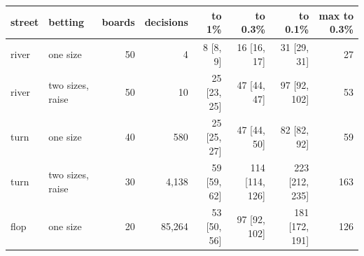 \begin{tabular}{llrrrrrr}
\toprule
street & betting & boards & decisions & to 1\% & to 0.3\% & to 0.1\% & max to 0.3\% \\ \midrule
river & one size & 50 & 4 & 8 [8, 9] & 16 [16, 17] & 31 [29, 31] & 27 \\
river & two sizes, raise & 50 & 10 & 25 [23, 25] & 47 [44, 47] & 97 [92, 102] & 53 \\
turn & one size & 40 & 580 & 25 [25, 27] & 47 [44, 50] & 82 [82, 92] & 59 \\
turn & two sizes, raise & 30 & 4,138 & 59 [59, 62] & 114 [114, 126] & 223 [212, 235] & 163 \\
flop & one size & 20 & 85,264 & 53 [50, 56] & 97 [92, 102] & 181 [172, 191] & 126 \\
\bottomrule
\end{tabular}
